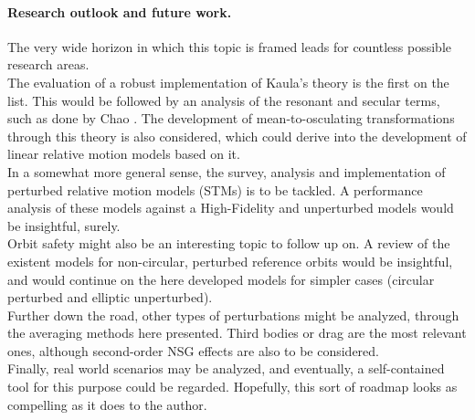 \paragraph{\indent Research outlook and future work. \\}
%
\indent The very wide horizon in which this topic is framed leads for countless possible research areas. \\
%
\indent The evaluation of a robust implementation of Kaula's theory is the first on the list. This would be followed by an analysis of the resonant and secular terms, such as done by Chao \cite{Chao}. The development of mean-to-osculating transformations through this theory is also considered, which could derive into the development of linear relative motion models based on it.\\
%
\indent In a somewhat more general sense, the survey, analysis and implementation of perturbed relative motion models (STMs) is to be tackled. A performance analysis of these models against a High-Fidelity and unperturbed models would be insightful, surely. \\
%
\indent Orbit safety might also be an interesting topic to follow up on. A review of the existent models for non-circular, perturbed reference orbits would be insightful, and would continue on the here developed models for simpler cases (\ie circular perturbed and elliptic unperturbed).\\
%
\indent Further down the road, other types of perturbations might be analyzed, through the averaging methods here presented. Third bodies or drag are the most relevant ones, although second-order NSG effects are also to be considered. \\
%
\indent Finally, real world scenarios may be analyzed, and eventually, a self-contained tool for this purpose could be regarded. Hopefully, this sort of roadmap looks as compelling as it does to the author.